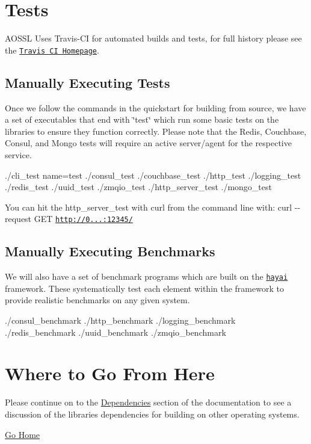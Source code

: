 \section*{Tests}

A\+O\+S\+SL Uses Travis-\/\+CI for automated builds and tests, for full history please see the \href{https://travis-ci.org/AO-StreetArt/AOSharedServiceLibrary}{\tt Travis CI Homepage}.

\subsection*{Manually Executing Tests}

Once we follow the commands in the quickstart for building from source, we have a set of executables that end with \char`\"{}test\char`\"{} which run some basic tests on the libraries to ensure they function correctly. Please note that the Redis, Couchbase, Consul, and Mongo tests will require an active server/agent for the respective service. \begin{DoxyVerb}./cli_test name=test
./consul_test
./couchbase_test
./http_test
./logging_test
./redis_test
./uuid_test
./zmqio_test
./http_server_test
./mongo_test
\end{DoxyVerb}


You can hit the http\+\_\+server\+\_\+test with curl from the command line with\+: {\ttfamily curl -\/-\/request G\+ET \textquotesingle{}\href{http://0.0.0.0:12345/'}{\tt http\+://0...\+:12345/\textquotesingle{}}}

\subsection*{Manually Executing Benchmarks}

We will also have a set of benchmark programs which are built on the \href{https://github.com/nickbruun/hayai}{\tt hayai} framework. These systematically test each element within the framework to provide realistic benchmarks on any given system. \begin{DoxyVerb}./consul_benchmark
./http_benchmark
./logging_benchmark
./redis_benchmark
./uuid_benchmark
./zmqio_benchmark
\end{DoxyVerb}


\section*{Where to Go From Here}

Please continue on to the \hyperlink{dependencies}{Dependencies} section of the documentation to see a discussion of the libraries dependencies for building on other operating systems.

\hyperlink{index}{Go Home} 